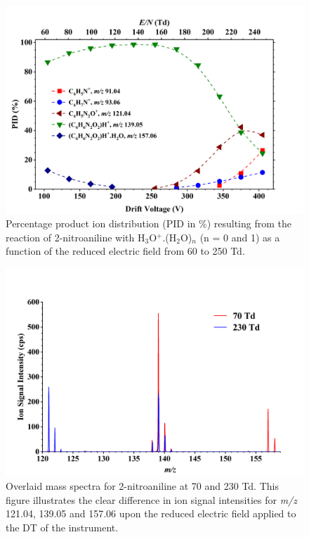 
\begin{figure}%
\centering
\includegraphics[height=0.35\textheight]{pics/nitros_paper_3.png}
\caption{Percentage product ion distribution (PID in \%) resulting from the reaction of 2-nitroaniline with H$_3$O$^+$.(H$_2$O)$_n$ (n = 0 and 1) as a function of the reduced electric field from 60 to 250 Td.}
\label{fig:na_fig3}
\end{figure}




\begin{figure}%
\centering
\includegraphics[height=0.35\textheight]{pics/nitros_paper_spec.png}
\caption{Overlaid mass spectra for 2-nitroaniline at 70 and 230 Td. This figure illustrates the clear difference in ion signal intensities for \textit{m/z} 121.04, 139.05 and 157.06 upon the reduced electric field applied to the DT of the instrument.}
\label{fig:na_spec}
\end{figure}


